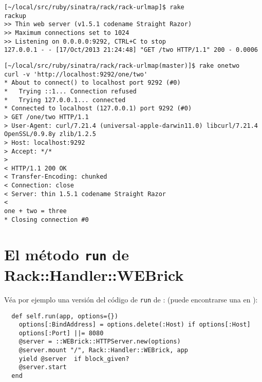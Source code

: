 \begin{verbatim}
[~/local/src/ruby/sinatra/rack/rack-urlmap]$ rake
rackup
>> Thin web server (v1.5.1 codename Straight Razor)
>> Maximum connections set to 1024
>> Listening on 0.0.0.0:9292, CTRL+C to stop
127.0.0.1 - - [17/Oct/2013 21:24:48] "GET /two HTTP/1.1" 200 - 0.0006
\end{verbatim}


\begin{verbatim}
[~/local/src/ruby/sinatra/rack/rack-urlmap(master)]$ rake onetwo
curl -v 'http://localhost:9292/one/two'
* About to connect() to localhost port 9292 (#0)
*   Trying ::1... Connection refused
*   Trying 127.0.0.1... connected
* Connected to localhost (127.0.0.1) port 9292 (#0)
> GET /one/two HTTP/1.1
> User-Agent: curl/7.21.4 (universal-apple-darwin11.0) libcurl/7.21.4 OpenSSL/0.9.8y zlib/1.2.5
> Host: localhost:9292
> Accept: */*
> 
< HTTP/1.1 200 OK
< Transfer-Encoding: chunked
< Connection: close
< Server: thin 1.5.1 codename Straight Razor
< 
one + two = three
* Closing connection #0

\end{verbatim}

\section{El método {\tt run} de Rack::Handler::WEBrick}

Véa por ejemplo una versión del código de \verb|run| de 
:
(puede encontrarse una en
):
\begin{verbatim}
  def self.run(app, options={})
    options[:BindAddress] = options.delete(:Host) if options[:Host]
    options[:Port] ||= 8080
    @server = ::WEBrick::HTTPServer.new(options)
    @server.mount "/", Rack::Handler::WEBrick, app 
    yield @server  if block_given?
    @server.start
  end 
\end{verbatim}

